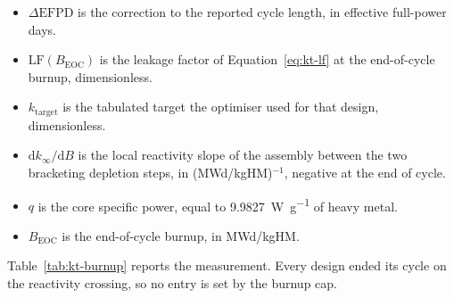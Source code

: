 \begin{itemize}
  \item $\Delta\mathrm{EFPD}$ is the correction to the reported cycle
        length, in effective full-power days.

  \item $\mathrm{LF}(B_\mathrm{EOC})$ is the leakage factor of
        Equation~\eqref{eq:kt-lf} at the end-of-cycle burnup,
        dimensionless.

  \item $k_\mathrm{target}$ is the tabulated target the optimiser used
        for that design, dimensionless.

  \item $\mathrm{d}k_\infty / \mathrm{d}B$ is the local reactivity
        slope of the assembly between the two bracketing depletion
        steps, in (MWd/kgHM)$^{-1}$, negative at the end of cycle.

  \item $q$ is the core specific power, equal to
        \SI{9.9827}{\watt\per\gram} of heavy metal.

  \item $B_\mathrm{EOC}$ is the end-of-cycle burnup, in MWd/kgHM.
\end{itemize}

Table~\ref{tab:kt-burnup} reports the measurement. Every design ended
its cycle on the reactivity crossing, so no entry is set by the burnup
cap.


